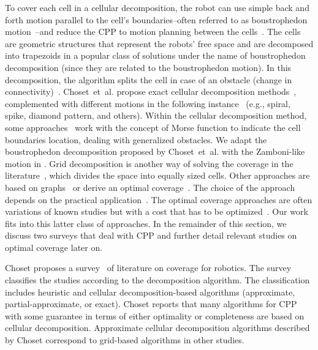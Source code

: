 To cover each cell in a cellular decomposition, the robot can use simple back and forth motion parallel to the cell's boundaries--often referred to as boustrophedon motion~\citep{lavalle2006planning}--and reduce the CPP to motion planning between the cells~\citep{choset2001coverage}. The cells are geometric structures that represent the robots' free space and are decomposed into trapezoids in a popular class of solutions under the name of boustrophedon decomposition (since they are related to the boustrophedon motion). In this decomposition, the algorithm splits the cell in case of an obstacle (change in connectivity)~\citep{choset2000exact}. Choset~et~al. propose exact cellular decomposition methods~\citep{choset1998coverage}, complemented with different motions in the following instance~\citep{choset2000exact} (e.g., spiral, spike, diamond pattern, and others). Within the cellular decomposition method, some approaches~\citep{choset2000exact,acar2002morse} work with the concept of Morse function to indicate the cell boundaries location, dealing with generalized obstacles. We adapt the boustrophedon decomposition proposed by Choset~et~al. with the Zamboni-like motion in . Grid decomposition is another way of solving the coverage in the literature~\citep{zelinsky1993planning,gabriely2002spiral,shnaps2016online,wei2018coverage}, which divides the space into equally sized cells. Other approaches are based on graphs~\citep{cheng2019graph} or derive an optimal coverage~\citep{huang2001optimal,xu2011optimal,lee2011smooth,li2011coverage,wei2018coverage}. The choice of the approach depends on the practical application~\citep{wei2018coverage}. The optimal coverage approaches are often variations of known studies but with a cost that has to be optimized~\citep{galceran2013survey}. Our work fits into this latter class of approaches. In the remainder of this section, we discuss two surveys that deal with CPP and further detail relevant studies on optimal coverage later on. 

Choset proposes a survey~\citep{choset2001coverage} of literature on coverage for robotics. The survey classifies the studies according to the decomposition algorithm. The classification includes heuristic and cellular decomposition-based algorithms (approximate, partial-approximate, or exact). Choset reports that many algorithms for CPP with some guarantee in terms of either optimality or completeness are based on cellular decomposition. Approximate cellular decomposition algorithms described by Choset correspond to grid-based algorithms in other studies.

